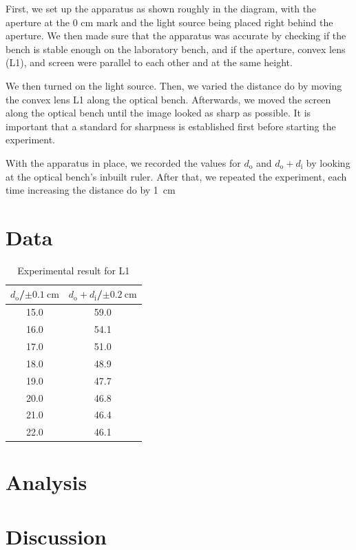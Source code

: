 \documentclass[letter,12pt]{article}
\numberwithin{equation}{section}
\numberwithin{figure}{section}
\numberwithin{table}{section}
\newcommand{\dist}[1] {\(d_{\mathrm{#1}}\)}
\newcommand{\mdist}[1] {d_{\mathrm{#1}}}
\begin{document}
First, we set up the apparatus as shown roughly in the diagram, with the aperture at the 0 cm mark and the light source being placed right behind the aperture. We then made sure that the apparatus was accurate by checking if the bench is stable enough on the laboratory bench, and if the aperture, convex lens (L1), and screen were parallel to each other and at the same height. 

We then turned on the light source. Then, we varied the distance do by moving the convex lens L1 along the optical bench. Afterwards, we moved the screen along the optical bench until the image looked as sharp as possible. It is important that a standard for sharpness is established first before starting the experiment.

With the apparatus in place, we recorded the values for \dist{o} and \(\mdist{o} + \mdist{i}\) by looking at the optical bench’s inbuilt ruler. After that, we repeated the experiment, each time increasing the distance do by \SI{1}{\cm}

\section{Data}
\begin{table}[!h]
  \centering
  \begin{tabular}{cc}
    \toprule
    {\(\mdist{o}\)/\(\pm \SI{0.1}{\cm}\)} & {\(\mdist{o} + \mdist{i}\)/\(\pm \SI{0.2}{\cm}\)} \\
    \midrule
    15.0 & 59.0 \\
    16.0 & 54.1 \\
    17.0 & 51.0 \\
    18.0 & 48.9 \\
    19.0 & 47.7 \\
    20.0 & 46.8 \\
    21.0 & 46.4 \\
    22.0 & 46.1 \\
    \bottomrule
  \end{tabular}
  \caption{Experimental result for L1}
  \label{table:d1}
\end{table}

\section{Analysis}
\begin{table}
\end{table}
\section{Discussion}
\end{document}
